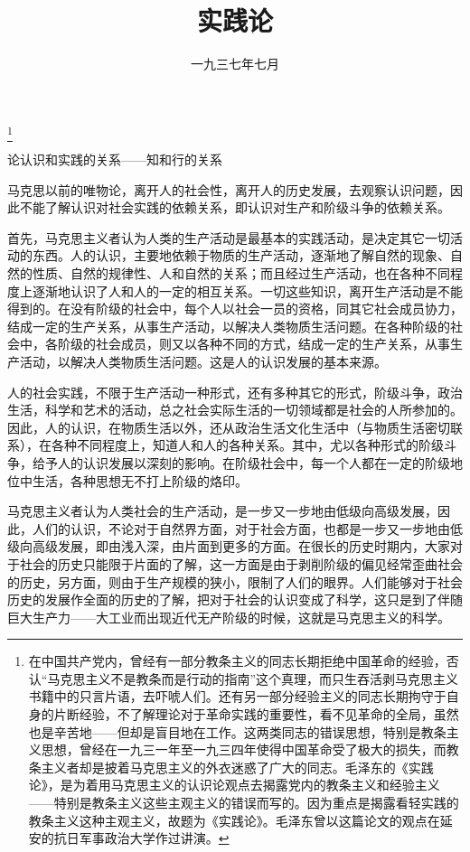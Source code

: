 
\title{实践论}
\date{一九三七年七月}
\thanks{在中国共产党内，曾经有一部分教条主义的同志长期拒绝中国革命的经验，否认“马克思主义不是教条而是行动的指南”这个真理，而只生吞活剥马克思主义书籍中的只言片语，去吓唬人们。还有另一部分经验主义的同志长期拘守于自身的片断经验，不了解理论对于革命实践的重要性，看不见革命的全局，虽然也是辛苦地——但却是盲目地在工作。这两类同志的错误思想，特别是教条主义思想，曾经在一九三一年至一九三四年使得中国革命受了极大的损失，而教条主义者却是披着马克思主义的外衣迷惑了广大的同志。毛泽东的《实践论》，是为着用马克思主义的认识论观点去揭露党内的教条主义和经验主义——特别是教条主义这些主观主义的错误而写的。因为重点是揭露看轻实践的教条主义这种主观主义，故题为《实践论》。毛泽东曾以这篇论文的观点在延安的抗日军事政治大学作过讲演。}
\maketitle


论认识和实践的关系——知和行的关系

马克思以前的唯物论，离开人的社会性，离开人的历史发展，去观察认识问题，因此不能了解认识对社会实践的依赖关系，即认识对生产和阶级斗争的依赖关系。

首先，马克思主义者认为人类的生产活动是最基本的实践活动，是决定其它一切活动的东西。人的认识，主要地依赖于物质的生产活动，逐渐地了解自然的现象、自然的性质、自然的规律性、人和自然的关系；而且经过生产活动，也在各种不同程度上逐渐地认识了人和人的一定的相互关系。一切这些知识，离开生产活动是不能得到的。在没有阶级的社会中，每个人以社会一员的资格，同其它社会成员协力，结成一定的生产关系，从事生产活动，以解决人类物质生活问题。在各种阶级的社会中，各阶级的社会成员，则又以各种不同的方式，结成一定的生产关系，从事生产活动，以解决人类物质生活问题。这是人的认识发展的基本来源。

人的社会实践，不限于生产活动一种形式，还有多种其它的形式，阶级斗争，政治生活，科学和艺术的活动，总之社会实际生活的一切领域都是社会的人所参加的。因此，人的认识，在物质生活以外，还从政治生活文化生活中（与物质生活密切联系），在各种不同程度上，知道人和人的各种关系。其中，尤以各种形式的阶级斗争，给予人的认识发展以深刻的影响。在阶级社会中，每一个人都在一定的阶级地位中生活，各种思想无不打上阶级的烙印。

马克思主义者认为人类社会的生产活动，是一步又一步地由低级向高级发展，因此，人们的认识，不论对于自然界方面，对于社会方面，也都是一步又一步地由低级向高级发展，即由浅入深，由片面到更多的方面。在很长的历史时期内，大家对于社会的历史只能限于片面的了解，这一方面是由于剥削阶级的偏见经常歪曲社会的历史，另方面，则由于生产规模的狭小，限制了人们的眼界。人们能够对于社会历史的发展作全面的历史的了解，把对于社会的认识变成了科学，这只是到了伴随巨大生产力——大工业而出现近代无产阶级的时候，这就是马克思主义的科学。

